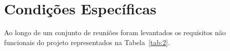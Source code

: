 \section{Condições Específicas}
Ao longo de um conjunto de reuniões foram levantados os requisitos não funcionais do projeto representados na Tabela~\ref{tab:2}.

